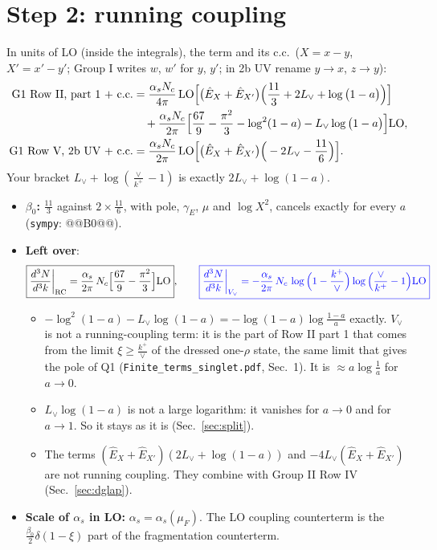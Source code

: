 \documentclass[10pt]{article}
\numberwithin{equation}{section}
\newcommand{\new}[1]{{\color{blue}#1}}
\newcommand{\Lv}{L_{\vee}}
\newcommand{\Eh}{\hat E}
\newcommand{\la}{\log\big(1-a\big)}
\begin{document}
\section{Step 2: running coupling}\label{sec:rc}
In units of LO (inside the integrals), the term and its c.c.\ ($X=x-y$, $X'=x'-y'$; Group I writes $w$, $w'$ for $y$, $y'$; in 2b UV rename $y\to x$, $z\to y$):
\begin{align}
\text{G1 Row II, part 1 $+$ c.c.}&=\frac{\alpha_sN_c}{4\pi}\,{\rm LO}\Big[\big(\Eh_X+\Eh_{X'}\big)\Big(\frac{11}{3}+2\Lv+\la\Big)\Big]\notag\\
&\quad+\frac{\alpha_sN_c}{2\pi}\Big[\frac{67}{9}-\frac{\pi^2}{3}-\log^2(1-a)-\Lv\la\Big]{\rm LO},\label{eq:rcII}\\
\text{G1 Row V, 2b UV $+$ c.c.}&=\frac{\alpha_sN_c}{2\pi}\,{\rm LO}\Big[\big(\Eh_X+\Eh_{X'}\big)\Big(-2\Lv-\frac{11}{6}\Big)\Big].\label{eq:rcV}
\end{align}
Your bracket $\Lv+\log(\frac{\vee}{k^+}-1)$ is exactly $2\Lv+\log(1-a)$.
\begin{itemize}
\item \textbf{$\beta_0$:} $\frac{11}{3}$ against $2\times\frac{11}{6}$, with pole, $\gamma_E$, $\mu$ and $\log X^2$, cancels exactly for every $a$ (\texttt{sympy}: @@B0@@).
\item \textbf{Left over}:
\begin{equation}
\boxed{\frac{d^3N}{d^3k}\bigg|_{\rm RC}=\frac{\alpha_s}{2\pi}\,N_c\Big[\frac{67}{9}-\frac{\pi^2}{3}\Big]{\rm LO}},\qquad
\new{\boxed{\frac{d^3N}{d^3k}\bigg|_{V_\vee}=-\frac{\alpha_s}{2\pi}\,N_c\,\log\Big(1-\frac{k^+}{\vee}\Big)\log\Big(\frac{\vee}{k^+}-1\Big){\rm LO}}}
\label{eq:rc}
\end{equation}
\begin{itemize}
\item \new{$-\log^2(1-a)-\Lv\log(1-a)=-\log(1-a)\log\frac{1-a}{a}$ exactly. $V_\vee$ is not a running-coupling term: it is the part of Row II part 1 that comes from the limit $\xi\ge\frac{k^+}{\vee}$ of the dressed one-$\rho$ state, the same limit that gives the pole of Q1 (\texttt{Finite\_terms\_singlet.pdf}, Sec.~1). It is $\approx a\log\frac1a$ for $a\to0$.}
\item $\Lv\log(1-a)$ is not a large logarithm: it vanishes for $a\to0$ and for $a\to1$. So it stays as it is (Sec.~\ref{sec:split}).
\item The terms $(\Eh_X+\Eh_{X'})(2\Lv+\log(1-a))$ and $-4\Lv(\Eh_X+\Eh_{X'})$ are not running coupling. They combine with Group II Row IV (Sec.~\ref{sec:dglap}).
\end{itemize}
\item \textbf{Scale of $\alpha_s$ in LO:} $\alpha_s=\alpha_s(\mu_F)$. The LO coupling counterterm is the $\frac{\beta_0}{2}\delta(1-\xi)$ part of the fragmentation counterterm.
\end{itemize}
\end{document}
